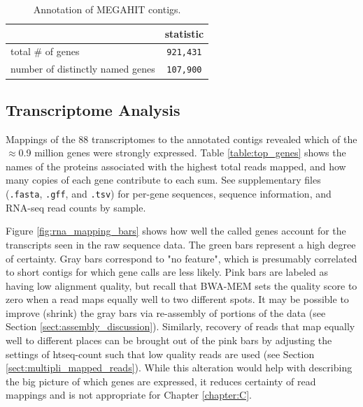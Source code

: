 \begin{table}[H]
\centering
\begin{singlespace}
\caption[Annotation of MEGAHIT contigs]
	{Annotation of MEGAHIT contigs.}
\begin{tabular}{l | c}
        & statistic  \\
\midrule
	total \# of genes & \texttt{921,431} \\ %
	number of distinctly named genes & \texttt{107,900} \\
\end{tabular}
\label{table:annotation}
\end{singlespace}
\end{table}







\subsection{Transcriptome Analysis}

Mappings of the 88 transcriptomes to the annotated contigs revealed which of the $\approx$0.9 million genes were strongly expressed.
Table \ref{table:top_genes} shows the names of the proteins associated with the highest total reads mapped, and how many copies of each gene contribute to each sum.
See supplementary files (\texttt{.fasta}, \texttt{.gff}, and \texttt{.tsv}) for per-gene sequences, sequence information, and RNA-seq read counts by sample.

Figure \ref{fig:rna_mapping_bars} shows how well the called genes account for the transcripts seen in the raw sequence data.
The green bars represent a high degree of certainty.
Gray bars correspond to "no feature", which is presumably correlated to short contigs for which gene calls are less likely.
Pink bars are labeled as having low alignment quality, but recall that BWA-MEM sets the quality score to zero when a read maps equally well to two different spots.
It may be possible to improve (shrink) the gray bars via re-assembly of portions of the data (see Section \ref{sect:assembly_discussion}).
Similarly, recovery of reads that map equally well to different places can be brought out of the pink bars by adjusting the settings of htseq-count such that low quality reads are used (see Section \ref{sect:multipli_mapped_reads}).
While this alteration would help with describing the big picture of which genes are expressed, it reduces certainty of read mappings and is not appropriate for Chapter \ref{chapter:C}.


